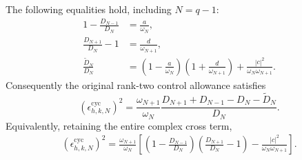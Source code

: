 \begin{proposition}
The following equalities hold, including $N=q-1$:
\[
 \begin{split}
 1-\frac{D_{N-1}}{D_N}&=\frac a{\omega_N},\\
 \frac{D_{N+1}}{D_N}-1&=\frac d{\omega_{N+1}},\\
 \frac{\widetilde D_N}{D_N}
 &=\left(1-\frac a{\omega_N}\right)
       \left(1+\frac d{\omega_{N+1}}\right)
      +\frac{|c|^2}{\omega_N\omega_{N+1}}.
 \end{split}
 \tag{CV.3}
\]
Consequently the original rank-two control allowance satisfies
\[
 \boxed{\quad
 (\epsilon_{h,k,N}^{\mathrm{cyc}})^2
 =\frac{\omega_{N+1}}{\omega_N}
 \frac{D_{N+1}+D_{N-1}-D_N-\widetilde D_N}{D_N}.
 \quad}
 \tag{CV.4}
\]
Equivalently, retaining the entire complex cross term,
\[
 \begin{split}
 (\epsilon_{h,k,N}^{\mathrm{cyc}})^2
 =\frac{\omega_{N+1}}{\omega_N}
 \left[
 \left(1-\frac{D_{N-1}}{D_N}\right)
 \left(\frac{D_{N+1}}{D_N}-1\right)
 -\frac{|c|^2}{\omega_N\omega_{N+1}}
 \right].
 \end{split}
 \tag{CV.5}
\]
\end{proposition}
